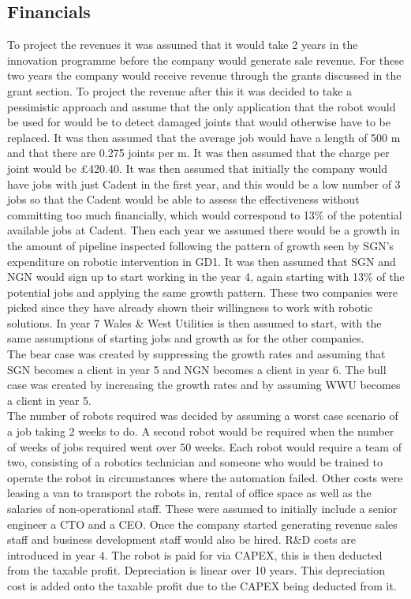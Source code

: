 \documentclass[11pt]{article}		%
\begin{document}
	        
	        \subsection{Financials}
		        	        
		        To project the revenues it was assumed that it would take 2 years in the innovation programme before the company would generate sale revenue. For these two years the company would receive revenue through the grants discussed in the grant section.
	            To project the revenue after this it was decided to take a pessimistic approach and assume that the only application that the robot would be used for would be to detect damaged joints that would otherwise have to be replaced. It was then assumed that the average job would have a length of 500 m and that there are 0.275 joints per m. It was then assumed that the charge per joint would be £420.40. It was then assumed that initially the company would have jobs with just Cadent in the first year, and this would be a low number of 3 jobs so that the Cadent would be able to assess the effectiveness without committing too much financially, which would correspond to 13\% of the potential available jobs at Cadent. Then each year we assumed there would be a growth in the amount of pipeline inspected following the pattern of growth seen by SGN’s expenditure on robotic intervention in GD1. It was then assumed that SGN and NGN would sign up to start working in the year 4, again starting with 13\% of the potential jobs and applying the same growth pattern. These two companies were picked since they have already shown their willingness to work with robotic solutions. In year 7 Wales \& West Utilities is then assumed to start, with the same assumptions of starting jobs and growth as for the other companies.
	            \\
			    The bear case was created by suppressing the growth rates and assuming that SGN becomes a client in year 5 and NGN becomes a client in year 6.
			    The bull case was created by increasing the growth rates and by assuming WWU becomes a client in year 5.
			    \\
			    The number of robots required was decided by assuming a worst case scenario of a job taking 2 weeks to do. A second robot would be required when the number of weeks of jobs required went over 50 weeks. Each robot would require a team of two, consisting of a robotics technician and someone who would be trained to operate the robot in circumstances where the automation failed.
			    Other costs were leasing a van to transport the robots in, rental of office space as well as the salaries of non-operational staff. These were assumed to initially include a senior engineer a CTO and a CEO. Once the company started generating revenue sales staff and business development staff would also be hired. R\&D costs are introduced in year 4. The robot is paid for via CAPEX, this is then deducted from the taxable profit. Depreciation is linear over 10 years. This depreciation cost is added onto the taxable profit due to the CAPEX being deducted from it.
\end{document}
